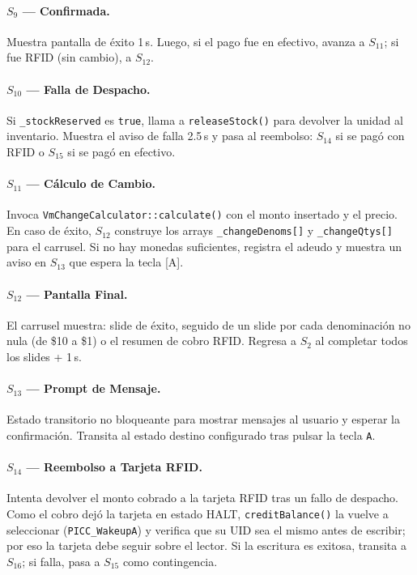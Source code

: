 \documentclass[12pt,a4paper]{article}
\begin{document}
\paragraph{$S_9$ — Confirmada.} Muestra pantalla de éxito 1\,s. Luego,
si el pago fue en efectivo, avanza a $S_{11}$; si fue RFID (sin cambio), a $S_{12}$.

\paragraph{$S_{10}$ — Falla de Despacho.} Si \texttt{\_stockReserved} es
\texttt{true}, llama a \texttt{releaseStock()} para devolver la unidad al
inventario. Muestra el aviso de falla 2.5\,s y pasa al reembolso: $S_{14}$ si
se pagó con RFID o $S_{15}$ si se pagó en efectivo.

\paragraph{$S_{11}$ — Cálculo de Cambio.} Invoca
\texttt{VmChangeCalculator::calculate()} con el monto insertado y el precio.
En caso de éxito, $S_{12}$ construye los arrays \texttt{\_changeDenoms[]} y
\texttt{\_changeQtys[]} para el carrusel. Si no hay monedas suficientes,
registra el adeudo y muestra un aviso en $S_{13}$ que espera la tecla [A].

\paragraph{$S_{12}$ — Pantalla Final.} El carrusel muestra: slide de éxito,
seguido de un slide por cada denominación no nula (de \$10 a \$1) o el
resumen de cobro RFID. Regresa a $S_2$ al completar todos los slides + 1\,s.

\paragraph{$S_{13}$ — Prompt de Mensaje.} Estado transitorio no bloqueante para mostrar
mensajes al usuario y esperar la confirmación. Transita al estado destino configurado
tras pulsar la tecla \texttt{A}.

\paragraph{$S_{14}$ — Reembolso a Tarjeta RFID.} Intenta devolver el monto cobrado a la tarjeta RFID tras un fallo de despacho. Como el cobro dejó la tarjeta en estado HALT, \texttt{creditBalance()} la vuelve a seleccionar (\texttt{PICC\_WakeupA}) y verifica que su UID sea el mismo antes de escribir; por eso la tarjeta debe seguir sobre el lector. Si la escritura es exitosa, transita a $S_{16}$; si falla, pasa a $S_{15}$ como contingencia.
\end{document}
